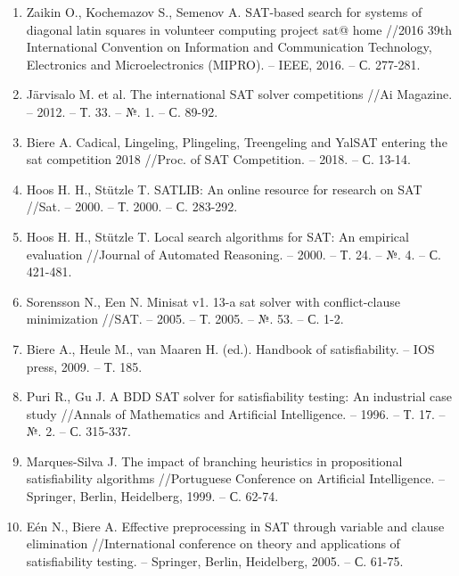 \begin{enumerate}[leftmargin=0.5cm,topsep=0pt,itemsep=-1ex,partopsep=1ex,parsep=1ex,ref=\arabic{*},label=\arabic{*}.]
\item\label{bib:ZaikinKochemazovSemenov}
Zaikin O., Kochemazov S., Semenov A. SAT-based search for systems of diagonal latin squares in volunteer computing project sat@ home //2016 39th International Convention on Information and Communication Technology, Electronics and Microelectronics (MIPRO). – IEEE, 2016. – С. 277-281.

\item\label{bib:Järvisalo}
Järvisalo M. et al. The international SAT solver competitions //Ai Magazine. – 2012. – Т. 33. – №. 1. – С. 89-92.
	
\item\label{bib:BiereCadical}
Biere A. Cadical, Lingeling, Plingeling, Treengeling and YalSAT entering the sat competition 2018 //Proc. of SAT Competition. – 2018. – С. 13-14.

\item\label{bib:HoosStützle}
Hoos H. H., Stützle T. SATLIB: An online resource for research on SAT //Sat. – 2000. – Т. 2000. – С. 283-292.

\item\label{bib:HoosWalkSAT}
Hoos H. H., Stützle T. Local search algorithms for SAT: An empirical evalua\-ti\-on //Journal of Automated Reasoning. – 2000. – Т. 24. – №. 4. – С. 421-481.

\item\label{bib:Sorensson}
Sorensson N., Een N. Minisat v1. 13-a sat solver with conflict-clause mini\-mi\-za\-ti\-on //SAT. – 2005. – Т. 2005. – №. 53. – С. 1-2.

\item\label{bib:BiereHeule}
Biere A., Heule M., van Maaren H. (ed.). Handbook of satisfiability. – IOS press, 2009. – Т. 185.

\item\label{bib:Puri}
Puri R., Gu J. A BDD SAT solver for satisfiability testing: An industrial case study //Annals of Mathematics and Artificial Intelligence. – 1996. – Т. 17. – №. 2. – С. 315-337.

\item\label{bib:MarquesSilva1999}
Marques-Silva J. The impact of branching heuristics in propositional satisfiabi\-li\-ty algorithms //Portuguese Conference on Artificial Intelligence. – Springer, Berlin, Heidelberg, 1999. – С. 62-74.

\item\label{bib:EénBiere}
Eén N., Biere A. Effective preprocessing in SAT through variable and clause elimination //International conference on theory and applications of satisfiabi\-li\-ty testing. – Springer, Berlin, Heidelberg, 2005. – С. 61-75.


\end{enumerate}
